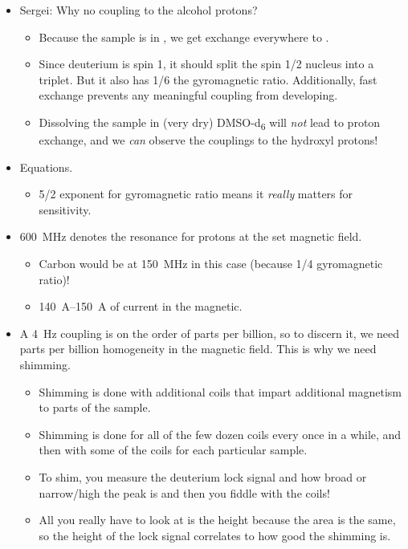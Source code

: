 \documentclass[../notes.tex]{subfiles}
\begin{document}
\begin{itemize}
\begin{itemize}
    \end{itemize}
    \item Sergei: Why no coupling to the alcohol protons?
    \begin{itemize}
        \item Because the sample is in , we get exchange everywhere to .
        \item Since deuterium is spin 1, it should split the spin 1/2 nucleus into a triplet. But it also has 1/6 the gyromagnetic ratio. Additionally, fast exchange prevents any meaningful coupling from developing.
        \item Dissolving the sample in (very dry) DMSO-d\textsubscript{6} will \emph{not} lead to proton exchange, and we \emph{can} observe the couplings to the hydroxyl protons!
    \end{itemize}
    \item Equations.
    \begin{itemize}
        \item 5/2 exponent for gyromagnetic ratio means it \emph{really} matters for sensitivity.
    \end{itemize}
    \item \SI{600}{\mega\hertz} denotes the resonance for protons at the set magnetic field.
    \begin{itemize}
        \item Carbon would be at \SI{150}{\mega\hertz} in this case (because 1/4 gyromagnetic ratio)!
        \item \SIrange{140}{150}{\ampere} of current in the magnetic.
    \end{itemize}
    \item A \SI{4}{\hertz} coupling is on the order of parts per billion, so to discern it, we need parts per billion homogeneity in the magnetic field. This is why we need shimming.
    \begin{itemize}
        \item Shimming is done with additional coils that impart additional magnetism to parts of the sample.
        \item Shimming is done for all of the few dozen coils every once in a while, and then with some of the coils for each particular sample.
        \item To shim, you measure the deuterium lock signal and how broad or narrow/high the peak is and then you fiddle with the coils!
        \item All you really have to look at is the height because the area is the same, so the height of the lock signal correlates to how good the shimming is.

\end{itemize}
\end{itemize}
\end{document}
